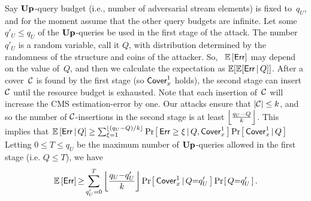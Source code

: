 Say $\textup{\textbf{Up}}\hspace{0.5pt}$-query budget (i.e., number of adversarial stream elements) is fixed to~$q_U$, and for the moment assume that the other query budgets are infinite.
Let some $q'_{U} \leq q_U$ of the $\textup{\textbf{Up}}\hspace{0.5pt}$-queries be used in the first stage of the attack. 
The number $q'_U$ is a random variable, call it $Q$, with distribution determined by the randomness of the structure and coins of the attacker. 
So, ~$\mathbb{E}\left[\mathsf{Err}\right]$ may depend on the value of~$Q$, and then we calculate the expectation as $\mathbb{E}[\mathbb{E}[\mathsf{Err}\,|\,Q]]$. 
After a cover~$\mathcal{C}$ is found by the first stage (so $\mathsf{Cover}^{1}_{x}$ holds), the second stage can insert $\mathcal{C}$ until the resource budget is exhausted. 
Note that each insertion of~$\mathcal{C}$ will increase the CMS estimation-error by one. Our attacks ensure that $|\mathcal{C}| \leq k$, and so the number of $\mathcal{C}$-insertions in the second stage is at least $\floor(\frac{q_U - Q}{k})$.  This implies that $\mathbb{E}\left[\mathsf{Err} \,|\, Q\right] \geq \sum_{\xi=1}^{\lfloor(q_U - Q)/k\rfloor} \Pr\hspace{-1pt}\left[\,\mathsf{Err} \geq \xi \,|\, Q, \mathsf{Cover}^{1}_{x}\,\right] \Pr\hspace{-1pt}\left[\,\mathsf{Cover}^{1}_{x} \,|\, Q\,\right]$
Letting $0 \leq T \leq q_U$ be the maximum number of $\textup{\textbf{Up}}\hspace{0.5pt}$-queries allowed in the first stage (i.e. $Q \leq T$), we have
\begin{equation*}
	\label{eqn:exp-err-cms}
	\mathbb{E}\left[{\mathsf{Err}}\right] {\geq}\sum_{q'_U{=}0}^{T} \left\lfloor\frac{q_U {-} q'_U}{k}\right\rfloor\Pr\hspace{-1pt}\left[\,\mathsf{Cover}^{1}_{x} \,|\, Q{=}q'_U\,\right]\Pr\hspace{-1pt}\left[\,Q{=}q'_U\,\right]{.}
\end{equation*}


